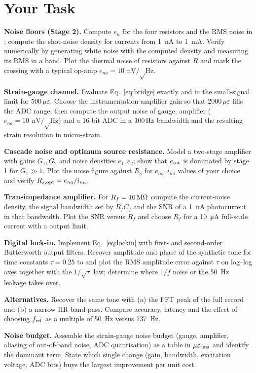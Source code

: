 \documentclass[11pt,a4paper]{article}
\begin{document}
\section*{Your Task}
\begin{tasks}
  \item \textbf{Noise floors (Stage 2).} Compute $e_n$ for the four resistors and the RMS noise in ; compute the shot-noise density for currents from \SI{1}{\nano\ampere} to \SI{1}{\milli\ampere}. Verify numerically by generating white noise with the computed density and measuring its RMS in a band. Plot the thermal noise of resistors against $R$ and mark the crossing with a typical op-amp $e_{na}=\SI{10}{\nano\volt\per\sqrt\hertz}$.
  \item \textbf{Strain-gauge channel.} Evaluate Eq.~\eqref{eq:bridge} exactly and in the small-signal limit for $500\,\mu\varepsilon$. Choose the instrumentation-amplifier gain so that $2000\,\mu\varepsilon$ fills the ADC range, then compute the output noise of gauge, amplifier ($e_{na}=\SI{10}{\nano\volt\per\sqrt\hertz}$) and a 16-bit ADC in a $\SI{100}{\hertz}$ bandwidth and the resulting strain resolution in micro-strain.
  \item \textbf{Cascade noise and optimum source resistance.} Model a two-stage amplifier with gains $G_1,G_2$ and noise densities $e_1,e_2$; show that $e_{\rm tot}$ is dominated by stage 1 for $G_1\gg1$. Plot the noise figure against $R_s$ for $e_{na},i_{na}$ values of your choice and verify $R_{s,\rm opt}=e_{na}/i_{na}$.
  \item \textbf{Transimpedance amplifier.} For $R_f=\SI{10}{\mega\ohm}$ compute the current-noise density, the signal bandwidth set by $R_fC_f$ and the SNR of a \SI{1}{\nano\ampere} photocurrent in that bandwidth. Plot the SNR versus $R_f$ and choose $R_f$ for a \SI{10}{\micro\ampere} full-scale current with a  output limit.
  \item \textbf{Digital lock-in.} Implement Eq.~\eqref{eq:lockin} with first- and second-order Butterworth output filters. Recover amplitude and phase of the synthetic tone for time constants $\tau=0.25$ to  and plot the RMS amplitude error against $\tau$ on log--log axes together with the $1/\sqrt\tau$ law; determine where $1/f$ noise or the \SI{50}{\hertz} leakage takes over.
  \item \textbf{Alternatives.} Recover the same tone with (a) the FFT peak of the full record and (b) a narrow IIR band-pass. Compare accuracy, latency and the effect of choosing $f_{\rm ref}$ as a multiple of \SI{50}{\hertz} versus \SI{137}{\hertz}.
  \item \textbf{Noise budget.} Assemble the strain-gauge noise budget (gauge, amplifier, aliasing of out-of-band noise, ADC quantisation) as a table in $\mu\varepsilon_{\rm rms}$ and identify the dominant term. State which single change (gain, bandwidth, excitation voltage, ADC bits) buys the largest improvement per unit cost.
\end{tasks}
\end{document}
